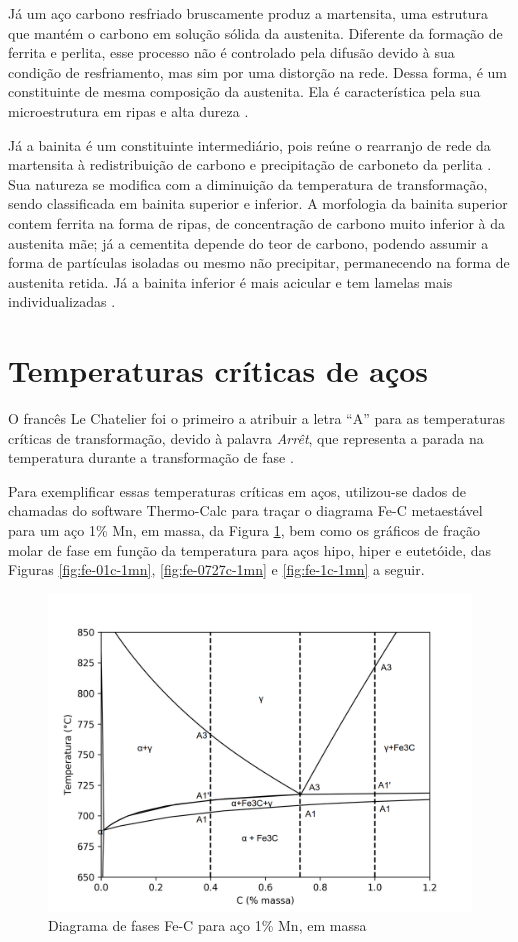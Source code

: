 \documentclass[brazil,tese,epusp]{usp}
\begin{document}
Já um aço carbono resfriado bruscamente produz a martensita, uma estrutura que mantém o carbono em solução sólida da austenita. Diferente da formação de ferrita e perlita, esse processo não é controlado pela difusão devido à sua condição de resfriamento, mas sim por uma distorção na rede. Dessa forma, é um constituinte de mesma composição da austenita. Ela é característica pela sua microestrutura em ripas e alta dureza \cite{Honeycombe1982}.

Já a bainita é um constituinte intermediário, pois reúne o rearranjo de rede da martensita à redistribuição de carbono e precipitação de carboneto da perlita \cite{Totten2006}. Sua natureza se modifica com a diminuição da temperatura de transformação, sendo classificada em bainita superior e inferior. A morfologia da bainita superior contem ferrita na forma de ripas, de concentração de carbono muito inferior à da austenita mãe; já a cementita depende do teor de carbono, podendo assumir a forma de partículas isoladas ou mesmo não precipitar, permanecendo na forma de austenita retida. Já a bainita inferior é mais acicular e tem lamelas mais individualizadas \cite{Honeycombe1982}.

\section{Temperaturas cr\'iticas de aços}

O francês Le Chatelier foi o primeiro a atribuir a letra ``A'' para as temperaturas críticas de transformação, devido à palavra \textit{Arrêt}, que representa a parada na temperatura durante a transformação de fase \cite{Silva2010}.

Para exemplificar essas temperaturas críticas em aços, utilizou-se dados de chamadas do software Thermo-Calc\textregistered{} para traçar o diagrama Fe-C metaestável para um aço 1\% Mn, em massa, da Figura \ref{fig:fe-1mn-C_isopleth}, bem como os gráficos de fração molar de fase em função da temperatura para aços hipo, hiper e eutetóide, das Figuras \ref{fig:fe-01c-1mn}, \ref{fig:fe-0727c-1mn} e \ref{fig:fe-1c-1mn} a seguir.

\begin{figure}[ht!]
  \includegraphics[width=.9\textwidth]{img/Fe-1Mn-C_isopleth_edited.png}
  \caption{Diagrama de fases Fe-C para aço 1\% Mn, em massa}
  \label{fig:fe-1mn-C_isopleth}
\end{figure}
\end{document}
